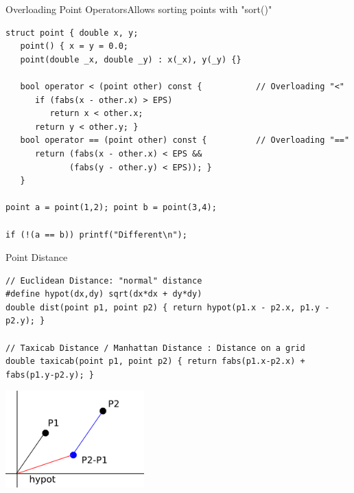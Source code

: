 \begin{frame}[fragile]{Overloading Point Operators}{Allows sorting points with "sort()"}

    \begin{exampleblock}{}
      {\smaller
\begin{verbatim}
struct point { double x, y;
   point() { x = y = 0.0;
   point(double _x, double _y) : x(_x), y(_y) {}

   bool operator < (point other) const {           // Overloading "<"
      if (fabs(x - other.x) > EPS)
         return x < other.x;
      return y < other.y; }
   bool operator == (point other) const {          // Overloading "=="
      return (fabs(x - other.x) < EPS &&
             (fabs(y - other.y) < EPS)); }
   }

point a = point(1,2); point b = point(3,4);

if (!(a == b)) printf("Different\n");
\end{verbatim}}
    \end{exampleblock}
\end{frame}

\begin{frame}[fragile]{Point Distance}
    \begin{exampleblock}{}
{\smaller
\begin{verbatim}
// Euclidean Distance: "normal" distance
#define hypot(dx,dy) sqrt(dx*dx + dy*dy)
double dist(point p1, point p2) { return hypot(p1.x - p2.x, p1.y - p2.y); }

// Taxicab Distance / Manhattan Distance : Distance on a grid
double taxicab(point p1, point p2) { return fabs(p1.x-p2.x) + fabs(p1.y-p2.y); }
\end{verbatim}}
    \end{exampleblock}

    \begin{center}
      \includegraphics[width=0.4\textwidth]{../img/geom1}
    \end{center}
\end{frame}

